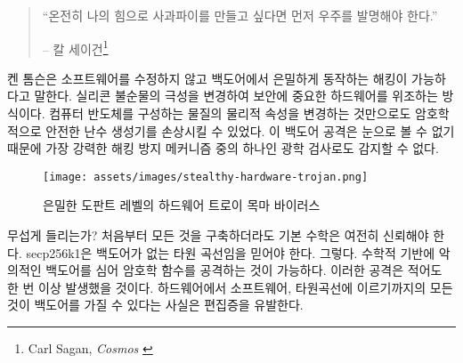 \begin{quotation}\begin{samepage}
		\enquote{온전히 나의 힘으로 사과파이를 만들고 싶다면 먼저 우주를 발명해야 한다.}
		\begin{flushright} -- 칼 세이건\footnote{Carl Sagan, \textit{Cosmos} \cite{cosmos}}
\end{flushright}\end{samepage}\end{quotation}

\begin{comment}
	The Ken Thompson Hack is a particularly ingenious and hard-to-detect backdoor,
	so let's take a quick look at a hard-to-detect backdoor which works without
	modifying any software. Researchers found a way to compromise security-critical
	hardware by altering the polarity of silicon
	impurities.~\cite{becker2013stealthy} Just by changing the physical properties
	of the stuff that computer chips are made of they were able to compromise a
	cryptographically secure random number generator. Since this change can't be
	seen, the backdoor can't be detected by optical inspection, which is one of the
	most important tamper-detection mechanism for chips like these.
\end{comment}
켄 톰슨은 소프트웨어를 수정하지 않고 백도어에서 은밀하게 동작하는 해킹이 가능하다고 말한다.
실리콘 불순물의 극성을 변경하여 보안에 중요한 하드웨어를 위조하는 방식이다\cite{becker2013stealthy}.
컴퓨터 반도체를 구성하는 물질의 물리적 속성을 변경하는 것만으로도 암호학적으로 안전한 난수 생성기를 손상시킬 수 있었다.
이 백도어 공격은 눈으로 볼 수 없기 때문에 가장 강력한 해킹 방지 메커니즘 중의 하나인 광학 검사로도 감지할 수 없다.

\begin{figure}
	\texttt{[image: assets/images/stealthy-hardware-trojan.png]}
	\caption{은밀한 도판트 레벨의 하드웨어 트로이 목마 바이러스}
	\label{fig:stealthy-hardware-trojan}
\end{figure}

\begin{comment}
	Sounds scary? Well, even if you would be able to build everything from
	scratch, you would still have to trust the underlying mathematics. You
	would have to trust that \textit{secp256k1} is an elliptic curve without
	backdoors. Yes, malicious backdoors can be inserted in the mathematical
	foundations of cryptographic functions and arguably this has already
	happened at least once.~\cite{wiki:Dual_EC_DRBG} There are good reasons to be paranoid, and the
	fact that everything from your hardware, to your software, to the
	elliptic curves used can have backdoors~\cite{wiki:backdoors} are some of them.
\end{comment}
무섭게 들리는가? 처음부터 모든 것을 구축하더라도 기본 수학은 여전히 신뢰해야 한다.
secp256k1은 백도어가 없는 타원 곡선임을 믿어야 한다.
그렇다. 수학적 기반에 악의적인 백도어를 심어 암호학 함수를 공격하는 것이 가능하다. 
이러한 공격은 적어도 한 번 이상 발생했을 것이다\cite{wiki:Dual_EC_DRBG}.
하드웨어에서 소프트웨어, 타원곡선에 이르기까지의 모든 것이 백도어\cite{wiki:backdoors}를 가질 수 있다는 사실은
편집증을 유발한다.


